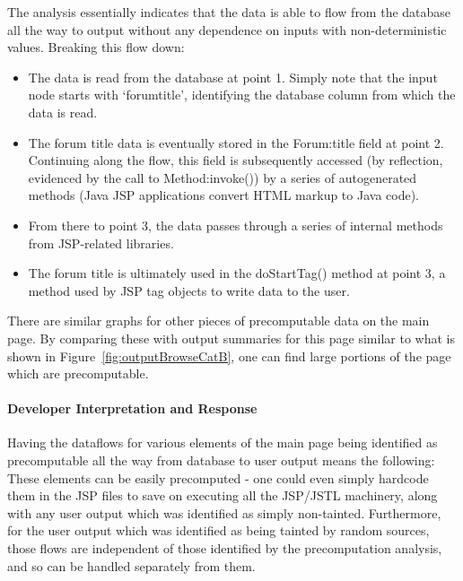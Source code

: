 \documentclass[msc,oneside]{ubcthesis}
\begin{document}
The analysis essentially indicates that the data is able to flow from the database all the way to output without any dependence on inputs with non-deterministic values. Breaking this flow down:

\begin{itemize}
\item The data is read from the database at point 1. Simply note that the input node starts with `forumtitle', identifying the database column from which the data is read.
\item The forum title data is eventually stored in the Forum:title field at point 2. Continuing along the flow, this field is subsequently accessed (by reflection, evidenced by the call to Method:invoke()) by a series of autogenerated methods (Java JSP applications convert HTML markup to Java code). 
\item From there to point 3, the data passes through a series of internal methods from JSP-related libraries.
\item The forum title is ultimately used in the doStartTag() method at point 3, a method used by JSP tag objects to write data to the user.
\end{itemize}

There are similar graphs for other pieces of precomputable data on the main page. By comparing these with output summaries for this page similar to what is shown in Figure~\ref{fig:outputBrowseCatB}, one can find large portions of the page which are precomputable.
 
\paragraph{Developer Interpretation and Response}
Having the dataflows for various elements of the main page being identified as precomputable all the way from database to user output means the following: These elements can be easily precomputed - one could even simply hardcode them in the JSP files to save on executing all the JSP/JSTL machinery, along with any user output which was identified as simply non-tainted. Furthermore, for the user output which was identified as being tainted by random sources, those flows are independent of those identified by the precomputation analysis, and so can be handled separately from them.
\end{document}
